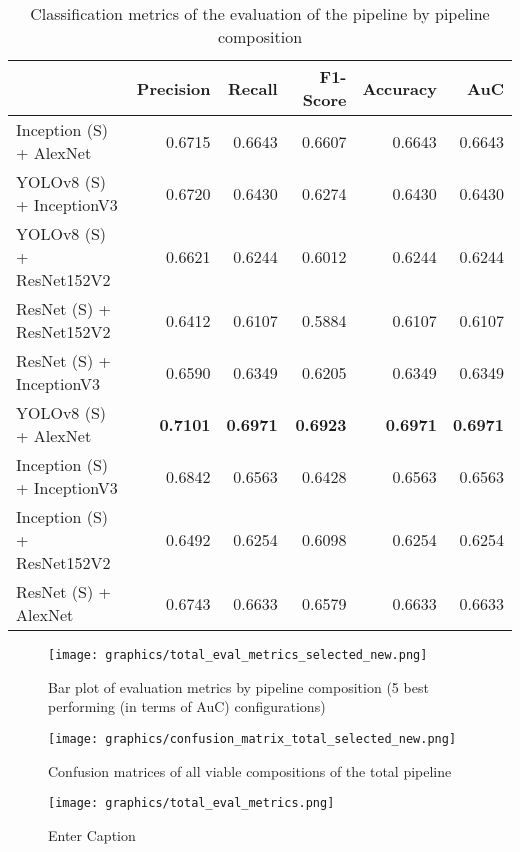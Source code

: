 \documentclass[draft,final]{vutinfth} %
\begin{document}
\begin{table}[]
    \centering
    \begin{tabular}{lrrrrr}
    \toprule
     & Precision & Recall & F1-Score & Accuracy & AuC \\
    \midrule
    Inception (S) + AlexNet & 0.6715 & 0.6643 & 0.6607 & 0.6643 & 0.6643 \\
    YOLOv8 (S) + InceptionV3 & 0.6720 & 0.6430 & 0.6274 & 0.6430 & 0.6430 \\
    YOLOv8 (S) + ResNet152V2 & 0.6621 & 0.6244 & 0.6012 & 0.6244 & 0.6244 \\
    ResNet (S) + ResNet152V2 & 0.6412 & 0.6107 & 0.5884 & 0.6107 & 0.6107 \\
    ResNet (S) + InceptionV3 & 0.6590 & 0.6349 & 0.6205 & 0.6349 & 0.6349 \\
    YOLOv8 (S) + AlexNet & \textbf{0.7101} & \textbf{0.6971} & \textbf{0.6923} & \textbf{0.6971} & \textbf{0.6971} \\
    Inception (S) + InceptionV3 & 0.6842 & 0.6563 & 0.6428 & 0.6563 & 0.6563 \\
    Inception (S) + ResNet152V2 & 0.6492 & 0.6254 & 0.6098 & 0.6254 & 0.6254 \\
    ResNet (S) + AlexNet & 0.6743 & 0.6633 & 0.6579 & 0.6633 & 0.6633 \\
    \bottomrule
    \end{tabular}
    \caption{Classification metrics of the evaluation of the pipeline by pipeline composition}
    \label{tab:total_eval}
\end{table}

\begin{figure}
    \centering
    \texttt{[image: graphics/total\_eval\_metrics\_selected\_new.png]}
    \caption{Bar plot of evaluation metrics by pipeline composition (5 best performing (in terms of AuC) configurations)}
    \label{fig:enter-label}
\end{figure}

\begin{figure}
    \centering
    \texttt{[image: graphics/confusion\_matrix\_total\_selected\_new.png]}
    \caption{Confusion matrices of all viable compositions of the total pipeline}
    \label{fig:enter-label}
\end{figure}

\iffalse %
\begin{figure}
    \centering
    \texttt{[image: graphics/total\_eval\_metrics.png]}
    \caption{Enter Caption}
    \label{fig:total_eval}
\end{figure}
\end{document}
